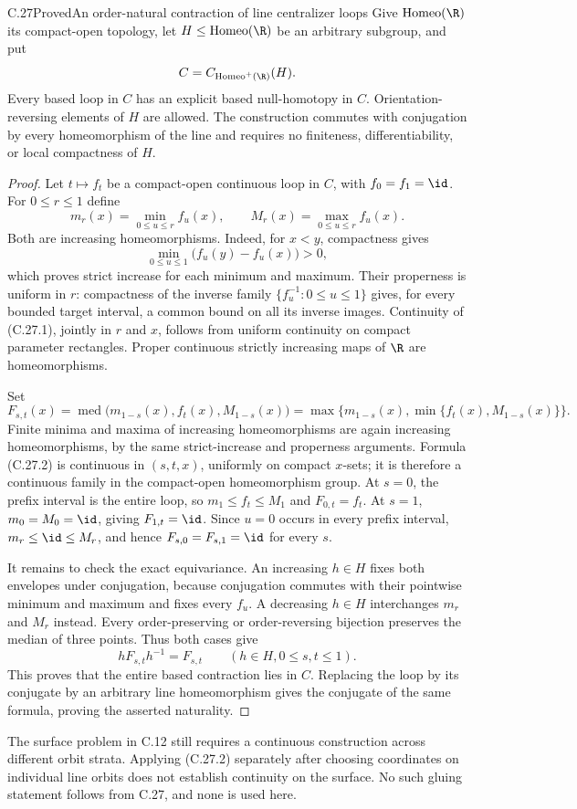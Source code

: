 \begin{claim}{C.27}{Proved}{An order-natural contraction of line centralizer loops}
Give $\operatorname{Homeo}(\R)$ its compact-open topology, let
$H\leq\operatorname{Homeo}(\R)$ be an arbitrary subgroup, and put
\[
              C=C_{\operatorname{Homeo}^+(\R)}(H).
\]
Every based loop in $C$ has an explicit based null-homotopy in $C$.
Orientation-reversing elements of $H$ are allowed. The construction
commutes with conjugation by every homeomorphism of the line and
requires no finiteness, differentiability, or local compactness of $H$.
\end{claim}
\begin{proof}
Let $t\mapsto f_t$ be a compact-open continuous loop in $C$, with
$f_0=f_1=\id$. For $0\leq r\leq1$ define
\[
 m_r(x)=\min_{0\leq u\leq r}f_u(x),\qquad
 M_r(x)=\max_{0\leq u\leq r}f_u(x).                    \tag{C.27.1}
\]
Both are increasing homeomorphisms. Indeed, for $x<y$, compactness
gives
\[
 \min_{0\leq u\leq1}\bigl(f_u(y)-f_u(x)\bigr)>0,
\]
which proves strict increase for each minimum and maximum. Their
properness is uniform in $r$: compactness of the inverse family
$\{f_u^{-1}:0\leq u\leq1\}$ gives, for every bounded target interval,
a common bound on all its inverse images. Continuity of (C.27.1),
jointly in $r$ and $x$, follows from uniform continuity on compact
parameter rectangles. Proper continuous strictly increasing maps of
$\R$ are homeomorphisms.

Set
\[
 F_{s,t}(x)=\operatorname{med}
      \bigl(m_{1-s}(x),f_t(x),M_{1-s}(x)\bigr)
   =\max\{m_{1-s}(x),\min\{f_t(x),M_{1-s}(x)\}\}.
                                                        \tag{C.27.2}
\]
Finite minima and maxima of increasing homeomorphisms are again
increasing homeomorphisms, by the same strict-increase and properness
arguments. Formula (C.27.2) is continuous in $(s,t,x)$, uniformly on
compact $x$-sets; it is therefore a continuous family in the
compact-open homeomorphism group. At $s=0$, the prefix interval is
the entire loop, so $m_1\leq f_t\leq M_1$ and $F_{0,t}=f_t$.
At $s=1$, $m_0=M_0=\id$, giving $F_{1,t}=\id$. Since $u=0$ occurs
in every prefix interval, $m_r\leq\id\leq M_r$, and hence
$F_{s,0}=F_{s,1}=\id$ for every $s$.

It remains to check the exact equivariance. An increasing
$h\in H$ fixes both envelopes under conjugation, because conjugation
commutes with their pointwise minimum and maximum and fixes every
$f_u$. A decreasing $h\in H$ interchanges $m_r$ and $M_r$ instead.
Every order-preserving or order-reversing bijection preserves the
median of three points. Thus both cases give
\[
                   h F_{s,t}h^{-1}=F_{s,t}
       \qquad(h\in H, 0\leq s,t\leq1).
\]
This proves that the entire based contraction lies in $C$. Replacing
the loop by its conjugate by an arbitrary line homeomorphism gives
the conjugate of the same formula, proving the asserted naturality.
\end{proof}

The surface problem in C.12 still requires a continuous construction
across different orbit strata. Applying (C.27.2) separately after
choosing coordinates on individual line orbits does not establish
continuity on the surface. No such gluing statement follows from
C.27, and none is used here.
